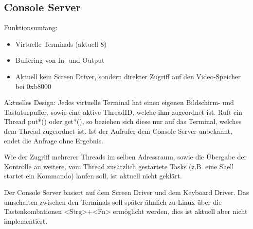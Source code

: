 \subsection{Console Server}



Funktionsumfang:
\begin{itemize}
	\item Virtuelle Terminals (aktuell 8)
	\item Buffering von In- und Output
	\item Aktuell kein Screen Driver, sondern direkter Zugriff auf den Video-Speicher bei 0xb8000
\end{itemize}

Aktuelles Design: Jedes virtuelle Terminal hat einen eigenen Bildschirm- und Tastaturpuffer, sowie eine aktive ThreadID, welche ihm zugeordnet ist. Ruft ein Thread put*() oder get*(), so beziehen sich diese nur auf das Terminal, welches dem Thread zugeordnet ist. Ist der Aufrufer dem Console Server unbekannt, endet die Anfrage ohne Ergebnis.

Wie der Zugriff mehrerer Threads im selben Adressraum, sowie die Übergabe der Kontrolle an weitere, vom Thread zusätzlich gestartete Tasks (z.B. eine Shell startet ein Kommando) laufen soll, ist aktuell nicht geklärt.

Der Console Server basiert auf dem Screen Driver und dem Keyboard Driver. Das umschalten zwischen den Terminals soll später ähnlich zu Linux über die Tastenkombationen <Strg>+<Fn> ermöglicht werden, dies ist aktuell aber nicht implementiert.